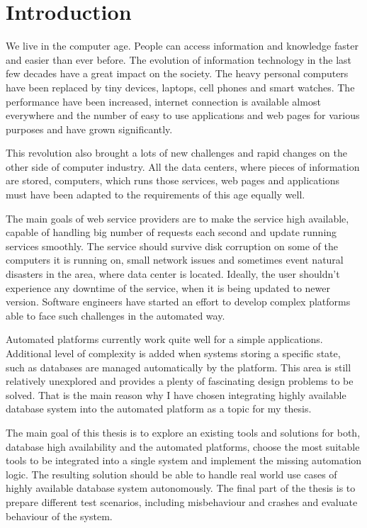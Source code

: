 \documentclass[
  digital, %
  twoside, %
  table,   %
  lof,     %
  lot,     %
]{fithesis3}
\begin{document}
\chapter{Introduction}

We live in the computer age. People can access information and knowledge faster and easier than ever before. The evolution of information technology in the last few decades have a great impact on the society. The heavy personal computers have been replaced by tiny devices, laptops, cell phones and smart watches. The performance have been increased, internet connection is available almost everywhere and the number of easy to use applications and web pages for various purposes and have grown significantly.

This revolution also brought a lots of new challenges and rapid changes on the other side of computer industry. All the data centers, where pieces of information are stored, computers, which runs those services, web pages and applications must have been adapted to the requirements of this age equally well.

The main goals of web service providers are to make the service high available, capable of handling big number of requests each second and update running services smoothly. The service should survive disk corruption on some of the computers it is running on, small network issues and sometimes event natural disasters in the area, where data center is located. Ideally, the user shouldn't experience any downtime of the service, when it is being updated to newer version. Software engineers have started an effort to develop complex platforms able to face such challenges in the automated way.

Automated platforms currently work quite well for a simple applications. Additional level of complexity is added when systems storing a specific state, such as databases are managed automatically by the platform. This area is still relatively unexplored and provides a plenty of fascinating design problems to be solved. That is the main reason why I have chosen integrating highly available database system into the automated platform as a topic for my thesis.

The main goal of this thesis is to explore an existing tools and solutions for both, database high availability and the automated platforms, choose the most suitable tools to be integrated into a single system and implement the missing automation logic. The resulting solution should be able to handle real world use cases of highly available database system autonomously. The final part of the thesis is to prepare different test scenarios, including misbehaviour and crashes and evaluate behaviour of the system.
\end{document}
